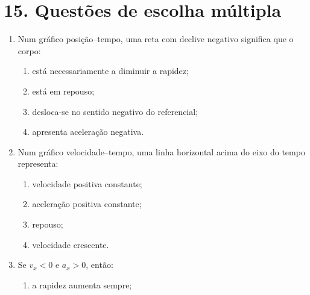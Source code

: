 \documentclass[11pt,a4paper]{article}
\begin{document}
	\section{15. Questões de escolha múltipla}
	
	\begin{enumerate}[label=\textbf{\arabic*.},resume]
		
		\item Num gráfico posição--tempo, uma reta com declive negativo significa que
		o corpo:
		
		\begin{enumerate}[label=\Alph*.]
			
			\item está necessariamente a diminuir a rapidez;
			
			\item está em repouso;
			
			\item desloca-se no sentido negativo do referencial;
			
			\item apresenta aceleração negativa.
			
		\end{enumerate}
		
		\item Num gráfico velocidade--tempo, uma linha horizontal acima do eixo do
		tempo representa:
		
		\begin{enumerate}[label=\Alph*.]
			
			\item velocidade positiva constante;
			
			\item aceleração positiva constante;
			
			\item repouso;
			
			\item velocidade crescente.
			
		\end{enumerate}
		
		\item Se $v_x<0$ e $a_x>0$, então:
		
		\begin{enumerate}[label=\Alph*.]
			
			\item a rapidez aumenta sempre;
			

\end{enumerate}
\end{enumerate}
\end{document}
